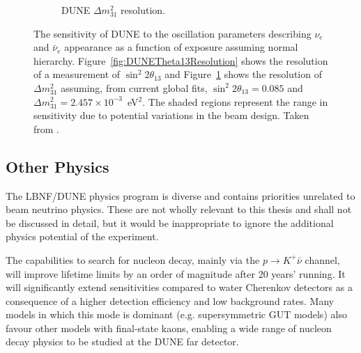 \begin{figure}
\begin{subfigure}[t]{0.48\linewidth}
    \caption{DUNE $\Delta m_{31}^2$ resolution.}
    \label{fig:DUNEDeltaM31Resolution}
  \end{subfigure}
  \caption[The sensitivity of DUNE to the oscillation parameters describing $\nu_e$ and $\bar{\nu}_e$ appearance.]{The sensitivity of DUNE to the oscillation parameters describing $\nu_e$ and $\bar{\nu}_e$ appearance as a function of exposure assuming normal hierarchy.  Figure~\ref{fig:DUNETheta13Resolution} shows the resolution of a measurement of $\sin^2{2\theta_{13}}$ and Figure~\ref{fig:DUNEDeltaM31Resolution} shows the resolution of $\Delta m_{31}^2$ assuming, from current global fits, $\sin^2{2\theta_{13}}=0.085$ and $\Delta m_{31}^2=2.457\times10^{-3}$~eV$^2$.  The shaded regions represent the range in sensitivity due to potential variations in the beam design.  Taken from \cite{DUNECDR2}.}
  \label{fig:DUNETheta13}
\end{figure}

\subsection{Other Physics}\label{sec:DUNEOtherPhysics}

The LBNF/DUNE physics program is diverse and contains priorities unrelated to beam neutrino physics.  These are not wholly relevant to this thesis and shall not be discussed in detail, but it would be inappropriate to ignore the additional physics potential of the experiment.

The capabilities to search for nucleon decay, mainly via the $p\rightarrow K^+\bar{\nu}$ channel, will improve lifetime limits by an order of magnitude after 20 years' running.  It will significantly extend sensitivities compared to water Cherenkov detectors as a consequence of a higher detection efficiency and low background rates.  Many models in which this mode is dominant (e.g. supersymmetric GUT models) also favour other models with final-state kaons, enabling a wide range of nucleon decay physics to be studied at the DUNE far detector.

